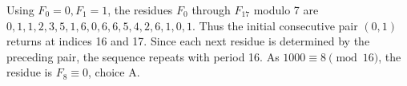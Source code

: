 Using $F_0=0,F_1=1$, the residues $F_0$ through $F_{17}$ modulo 7 are $0,1,1,2,3,5,1,6,0,6,6,5,4,2,6,1,0,1$. Thus the initial consecutive pair $(0,1)$ returns at indices 16 and 17. Since each next residue is determined by the preceding pair, the sequence repeats with period 16. As $1000\equiv8\pmod{16}$, the residue is $F_8\equiv\boxed0$, choice A.
